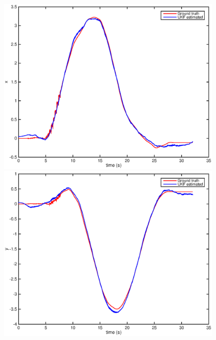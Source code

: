 \documentclass[letter, 10pt]{article}
\begin{document}
\begin{onehalfspacing}
\begin{figure}[h]
	\centering
	\begin{minipage}{.25\textwidth} 
  		\centering
    		\includegraphics[width=1\linewidth]{r_x.eps}
	\end{minipage}%
	\begin{minipage}{.25\textwidth} 
		\centering
    		\includegraphics[width=1\linewidth]{r_y.eps}
	\end{minipage}%
	\begin{minipage}{.25\textwidth}  		
		\centering

\end{minipage}
\end{figure}
\end{onehalfspacing}
\end{document}
